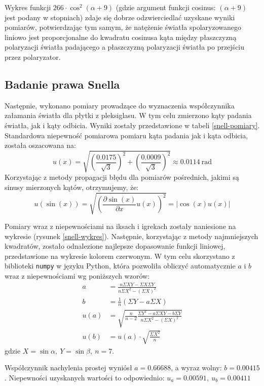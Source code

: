 \documentclass[a4paper]{article}
\newlength{\du}
\begin{document}
Wykres funkcji $266 \cdot \cos^2(\alpha + 9)$ (gdzie argument funkcji cosinus: $(\alpha + 9)$ jest podany w stopniach) zdaje się dobrze odzwierciedlać uzyskane wyniki pomiarów, potwierdzając tym samym, że natężenie światła spolaryzowanego liniowo jest proporcjonalne do kwadratu cosinusa kąta między płaszczyzną polaryzacji światła padającego a płaszczyzną polaryzacji światła po przejściu przez polaryzator.


\subsection{Badanie prawa Snella}
Następnie, wykonano pomiary prowadzące do wyznaczenia współczynnika załamania światła dla płytki z pleksiglasu.
W tym celu zmierzono kąty padania światła, jak i kąty odbicia.
Wyniki zostały przedstawione w tabeli \ref{snell-pomiary}.
Standardowa niepewność pomiarowa pomiaru kąta padania jak i kąta odbicia, została oszacowana na:
\[
	u(x) = \sqrt{ 
		\left( \frac{0.0175}{\sqrt{3}} \right)^2 
	  + \left( \frac{0.0009}{\sqrt{3}} \right)^2
	}
\approx 0.0114 \ \text{rad}
\]
Korzystając z metody propagacji błędu dla pomiarów pośrednich, jakimi są sinusy mierzonych kątów, otrzymujemy, że:
\[
	u(\sin(x)) = \sqrt{\left(\frac{\partial \sin(x)}{\partial x}u(x)\right)^2} = \left|\cos(x)u(x)\right|
\]

Pomiary wraz z niepewnościami na iksach i igrekach zostały naniesione na wykresie (rysunek \ref{snell-wykres}).
Następnie, korzystając z metody najmniejszych kwadratów, zostało odnalezione najlepsze dopasowanie funkcji liniowej, przedstawione na wykresie kolorem czerwonym.
W tym celu skorzystano z biblioteki \texttt{numpy} w języku Python, która pozwoliła obliczyć automatycznie $a$ i $b$ wraz z niepewnościami wg poniższych wzorów:
\begin{align*}
a &= \frac{n \Sigma X Y - \Sigma X \Sigma Y}{n \Sigma X^2 - \left(\Sigma X\right)^2} \\
b &= \frac{1}{n}\left(\Sigma Y - a \Sigma X\right) \\
u(a) &= \sqrt{\frac{n}{n-2} \frac{\Sigma Y^2 - a\Sigma XY - b\Sigma Y}{n\Sigma X^2-\left(\Sigma X \right)^2}} \\
u(b) &= u(a)\cdot \sqrt{\frac{\Sigma X^2}{n}}
\end{align*}
gdzie $X = \sin\alpha, \ Y = \sin\beta, \ n = 7$.


Współczynnik nachylenia prostej wyniósł $a = 0.66688$, a wyraz wolny: $b = 0.00415$.
Niepewności uzyskanych wartości to odpowiednio:
$ u_a=0.00591, \ u_b=0.00411 $
\end{document}
